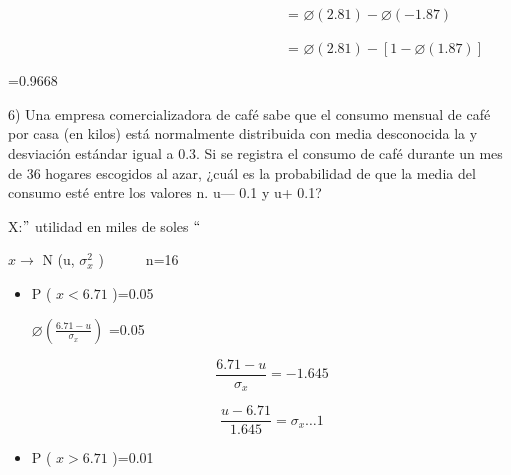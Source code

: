 \documentclass[10pt,a4paper]{article}
\begin{document}
\begin{flushleft}
\ \ \ \ \ \ \ \ \ \ \ \ \ \ \ \ \ \ \ \ \ \ \ \ \ \ \ \ \ \ \ \ \ \ \ \ \ \ \ \  = \(  \varnothing  \left( 2.81 \right) - \varnothing  \left( -1.87 \right)  \) \par

\ \ \ \ \ \ \ \ \ \ \ \ \ \ \ \ \ \ \ \ \ \ \ \ \ \ \ \ \ \ \ \ \ \ \ \ \ \ \ \  = \(  \varnothing  \left( 2.81 \right) - \left[ 1- \varnothing  \left( 1.87 \right)  \right]  \) \par

\tabto{1.48in} =0.9668\par


\vspace{\baselineskip}
\vspace{\baselineskip}
\vspace{\baselineskip}
\vspace{\baselineskip}

6) Una empresa comercializadora de café sabe que el consumo mensual de café por casa (en kilos) está normalmente distribuida con media desconocida la y desviación estándar igual a 0.3. Si se registra el consumo de café durante un mes de 36 hogares escogidos al azar, ¿cuál es la probabilidad de que la media del consumo esté entre los valores n. u— 0.1 y u+ 0.1?

\vspace{\baselineskip}\begin{multicols}{2}
	X:$"$  utilidad en miles de soles $``$\par
	
	\( x \rightarrow  \) N (u, \(   \sigma _{x}^{2} \) )\ \ \ \ \ \  n=16\par
	
	
	\vspace{\baselineskip}
	\begin{itemize}
		\item P ( \( x<6.71 \) )=0.05\par
		
		\(  \varnothing  \left( \frac{6.71-u}{ \sigma _{x}} \right)  \) =0.05\par
		
		\[  \]  \[ \frac{6.71-u}{ \sigma _{x}}=-1.645 \] \par
		
		\[  \]  \[ \frac{u-6.71}{1.645}= \sigma _{x} \ldots 1 \] \par
		
		\item P ( \( x>6.71 \) )=0.01
	\end{itemize}\par
	

\end{multicols}
\end{flushleft}
\end{document}
